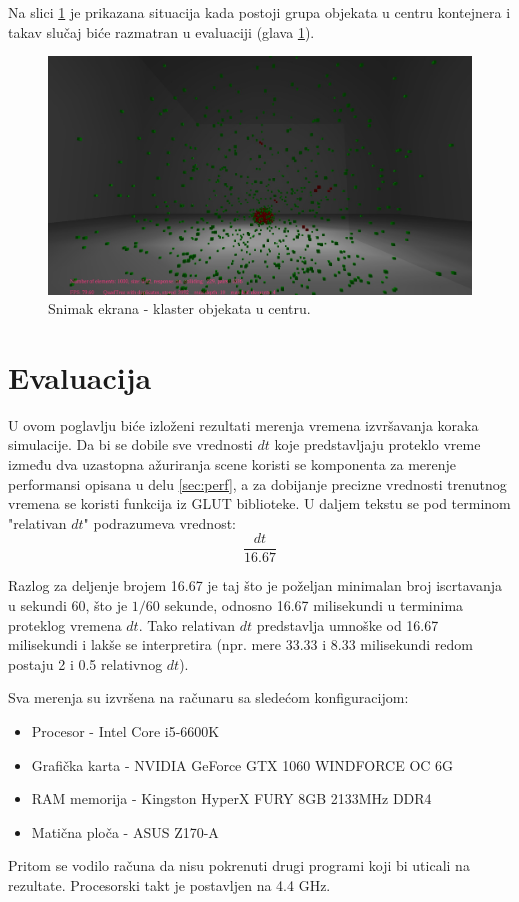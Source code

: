 \documentclass[12pt,oneside]{memoir}
\begin{document}
\noindent Na slici \ref{fig:ssyank} je prikazana situacija kada postoji grupa objekata u centru kontejnera i takav slučaj biće 
razmatran u evaluaciji (glava \ref{sec:evaluacija}).

\begin{figure}[h!]
	\centerfloat
	\includegraphics[scale=0.3]{ssyank.jpg}
	\caption{Snimak ekrana - klaster objekata u centru.}
	\label{fig:ssyank}
\end{figure}

\chapter{Evaluacija}
\label{sec:evaluacija}

U ovom poglavlju biće izloženi rezultati merenja vremena izvršavanja koraka simulacije.
Da bi se dobile sve vrednosti $dt$ koje predstavljaju proteklo vreme između dva uzastopna ažuriranja scene
koristi se komponenta za merenje performansi opisana u delu \ref{sec:perf}, a za dobijanje precizne vrednosti trenutnog vremena se koristi funkcija iz GLUT biblioteke.
U daljem tekstu se pod terminom "relativan $dt$" podrazumeva vrednost:
$$ \frac{ dt }{16.67} $$

Razlog za deljenje brojem 16.67 je taj što je poželjan minimalan broj iscrtavanja u sekundi 60, 
što je $1/60$ sekunde, odnosno 16.67 milisekundi u terminima proteklog vremena $dt$.
Tako relativan $dt$ predstavlja umnoške od 16.67 milisekundi i lakše se interpretira
(npr. mere 33.33 i 8.33 milisekundi redom postaju 2 i 0.5 relativnog $dt$).

Sva merenja su izvršena na računaru sa sledećom konfiguracijom:
\begin{itemize}  
	\item Procesor - Intel Core i5-6600K 
	\item Grafička karta - NVIDIA GeForce GTX 1060 WINDFORCE OC 6G
	\item RAM memorija - Kingston HyperX FURY 8GB 2133MHz DDR4 
	\item Matična ploča - ASUS Z170-A
\end{itemize}  
Pritom se vodilo računa da nisu pokrenuti drugi programi koji bi uticali na rezultate.
Procesorski takt je postavljen na 4.4 GHz.
\end{document}
